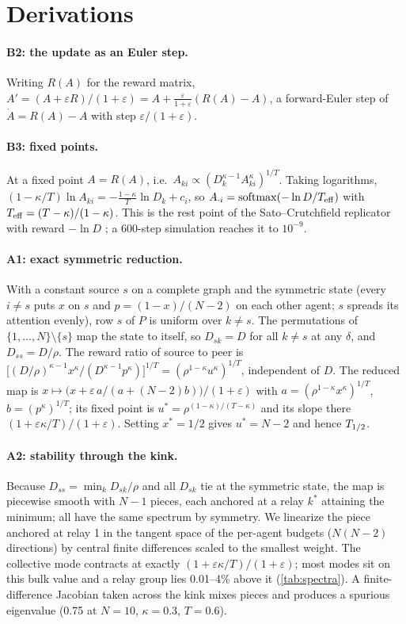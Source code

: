 \section{Derivations}\label{app:derivations}

\paragraph{B2: the update as an Euler step.} Writing $R(A)$ for the reward matrix, $A'=(A+\varepsilon R)/(1+\varepsilon)
=A+\frac{\varepsilon}{1+\varepsilon}(R(A)-A)$, a forward-Euler step of $\dot A=R(A)-A$ with step
$\varepsilon/(1+\varepsilon)$.

\paragraph{B3: fixed points.} At a fixed point $A=R(A)$, i.e.\ $A_{ki}\propto(D_k^{\kappa-1}A_{ki}^\kappa)^{1/T}$. Taking
logarithms, $(1-\kappa/T)\ln A_{ki}=-\frac{1-\kappa}{T}\ln D_k+c_i$, so $A_{\cdot i}=\mathrm{softmax}(-\ln D/T_{\mathrm{eff}})$ with
$T_{\mathrm{eff}}=(T-\kappa)/(1-\kappa)$. This is the rest point of the Sato--Crutchfield replicator with reward $-\ln D$
\citep{sato2003coupled}; a 600-step simulation reaches it to $10^{-9}$.

\paragraph{A1: exact symmetric reduction.} With a constant source $s$ on a complete graph and the symmetric state (every
$i\ne s$ puts $x$ on $s$ and $p=(1-x)/(N-2)$ on each other agent; $s$ spreads its attention evenly), row $s$ of $P$ is
uniform over $k\ne s$. The permutations of $\{1,\dots,N\}\setminus\{s\}$ map the state to itself, so $D_{sk}=D$ for all
$k\ne s$ at any $\delta$, and $D_{ss}=D/\rho$. The reward ratio of source to peer is
$\big[(D/\rho)^{\kappa-1}x^\kappa/(D^{\kappa-1}p^\kappa)\big]^{1/T}=(\rho^{1-\kappa}u^\kappa)^{1/T}$, independent of $D$.
The reduced map is $x\mapsto\big(x+\varepsilon\,a/(a+(N-2)b)\big)/(1+\varepsilon)$ with $a=(\rho^{1-\kappa}x^\kappa)^{1/T}$,
$b=(p^\kappa)^{1/T}$; its fixed point is $u^*=\rho^{(1-\kappa)/(T-\kappa)}$ and its slope there
$(1+\varepsilon\kappa/T)/(1+\varepsilon)$. Setting $x^*=1/2$ gives $u^*=N-2$ and hence $T_{1/2}$.

\paragraph{A2: stability through the kink.} Because $D_{ss}=\min_kD_{sk}/\rho$ and all $D_{sk}$ tie at the symmetric
state, the map is piecewise smooth with $N-1$ pieces, each anchored at a relay $k^*$ attaining the minimum; all have the
same spectrum by symmetry. We linearize the piece anchored at relay 1 in the tangent space of the per-agent budgets
($N(N-2)$ directions) by central finite differences scaled to the smallest weight. The collective mode contracts at
exactly $(1+\varepsilon\kappa/T)/(1+\varepsilon)$; most modes sit on this bulk value and a relay group lies 0.01--4\%
above it (\cref{tab:spectra}). A finite-difference Jacobian taken across the kink mixes pieces and produces a spurious
eigenvalue (0.75 at $N=10$, $\kappa=0.3$, $T=0.6$).

